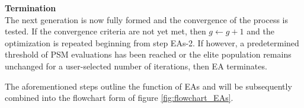 \begin{EA}


 
\item \textbf{Termination} \\
The next generation is now fully formed and the
convergence of the process is tested. If the convergence 
criteria are not yet met, then $g \leftarrow g + 1$
and the optimization is repeated beginning from step EAs-2. 
If however, a predetermined threshold of PSM evaluations has 
been reached or the elite population remains unchanged for a 
user-selected number of iterations, then EA terminates.
\end{EA}
\vspace{2mm}

The aforementioned steps outline the function of EAs and
will be subsequently combined into the flowchart form of figure 
\ref{fig:flowchart_EAs}.

\newpage


